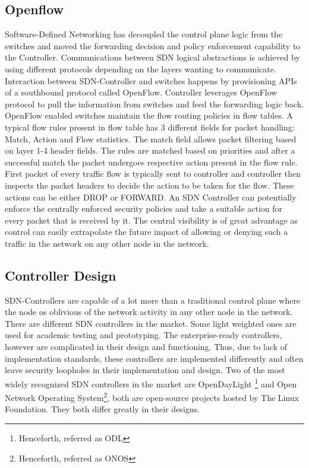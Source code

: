 \subsection{Openflow}
Software-Defined Networking has decoupled the control plane logic from the switches and moved the forwarding decision and policy enforcement capability to the Controller. Communications between SDN logical abstractions is achieved by using different protocols depending on the layers wanting to communicate. Interaction between SDN-Controller and switches happens by provisioning APIs of a southbound protocol called OpenFlow.
Controller leverages OpenFlow protocol to pull the information from switches and feed the forwarding logic back. OpenFlow enabled switches maintain the flow routing policies in flow tables. A typical flow rules present in flow table has 3 different fields for packet handling: Match, Action and Flow statistics. The match field allows packet filtering based on layer 1-4 header fields. The rules are matched based on priorities and after a successful match the packet undergoes respective action present in the flow rule. First packet of every traffic flow is typically sent to controller and controller then inspects the packet headers to decide the action to be taken for the flow. These actions can be either DROP or FORWARD. An SDN Controller can potentially enforce the centrally enforced security policies and take a suitable action for every packet that is received by it. The central visibility is of great advantage as control can easily extrapolate the future impact of allowing or denying such a traffic in the network on any other node in the network.

\subsection{Controller Design}
SDN-Controllers are capable of a lot more than a traditional control plane where the node os oblivious of the network activity in any other node in the network. There are different SDN controllers in the market. Some light weighted ones are used for academic testing and prototyping. The enterprise-ready controllers, however are complicated in their design and functioning. Thus, due to lack of implementation standards, these controllers are implemented differently and often leave security loopholes in their implementation and design. Two of the most widely recognized SDN controllers in the market are OpenDayLight \footnote{Henceforth, referred as ODL} and Open Network Operating System\footnote{Henceforth, referred as ONOS}, both are open-source projects hosted by The Linux Foundation. They both differ greatly in their designs. 

